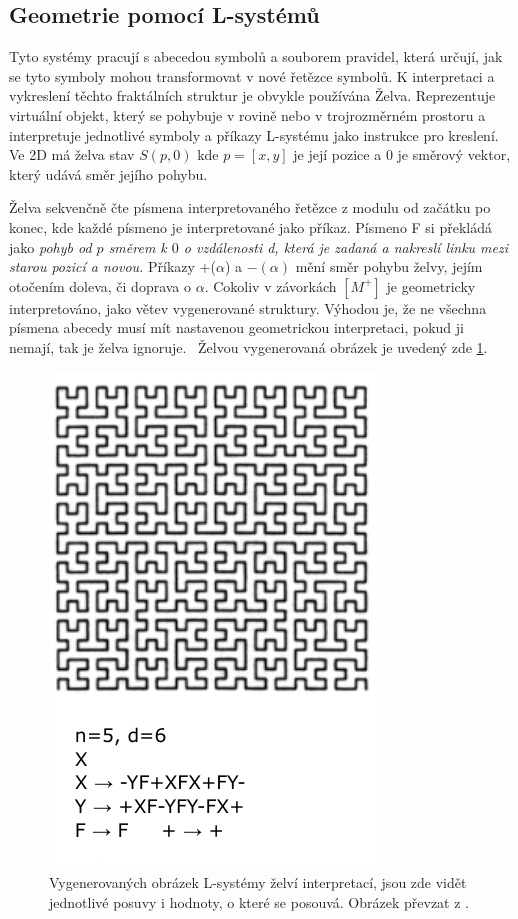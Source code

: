 \subsection{Geometrie pomocí L-systémů}
\label{lsystemGeometry}
Tyto systémy pracují s abecedou symbolů a souborem pravidel, která určují, jak se tyto symboly mohou transformovat v nové řetězce symbolů. K interpretaci a vykreslení těchto fraktálních struktur je obvykle používána Želva. Reprezentuje virtuální objekt, který se pohybuje v rovině nebo v trojrozměrném prostoru a interpretuje jednotlivé symboly a příkazy L-systému jako instrukce pro kreslení. Ve 2D má želva stav $S(p,0)$ kde $p=[x,y]$ je její pozice a $0$ je směrový vektor, který udává směr jejího pohybu. 

Želva sekvenčně čte písmena interpretovaného řetězce z modulu od začátku po konec, kde každé písmeno je interpretované jako příkaz. Písmeno F si překládá jako \emph{pohyb od $p$ směrem k $0$ o vzdálenosti d, která je zadaná a nakreslí linku mezi starou pozicí a novou.} Příkazy +($\alpha$) a $-(\alpha)$ mění směr pohybu želvy, jejím otočením doleva, či doprava o $\alpha$. Cokoliv v závorkách $[M^+]$ je geometricky interpretováno, jako větev vygenerované struktury. Výhodou je, že ne všechna písmena abecedy musí mít nastavenou geometrickou interpretaci, pokud ji nemají, tak je želva ignoruje.~\cite{prusinkiewicz1986graphical} Želvou vygenerovaná obrázek je uvedený zde \ref{lsysgeometry}.

\begin{figure}[H]
	\centering
	\includegraphics[scale=1]{obrazky-figures/L-system.pdf}
	\caption[L-system]{Vygenerovaných obrázek L-systémy želví interpretací, jsou zde vidět jednotlivé posuvy i hodnoty, o které se posouvá. Obrázek převzat z \cite{prusinkiewicz1986graphical}.}
	\label{lsysgeometry}
\end{figure}
\newpage

